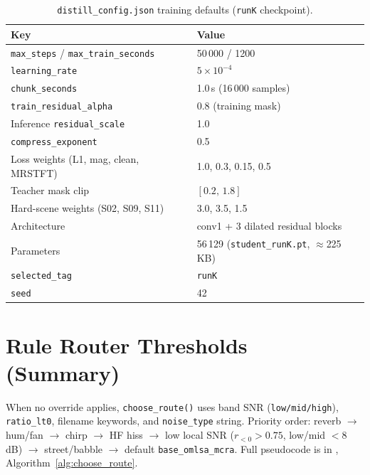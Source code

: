 \begin{table}[H]
  \centering
  \caption{\texttt{distill\_config.json} training defaults (\texttt{runK} checkpoint).}
  \label{tab:hp_distill}
  \footnotesize
  \begin{tabular}{ll}
    \toprule
    \textbf{Key} & \textbf{Value} \\
    \midrule
    \texttt{max\_steps} / \texttt{max\_train\_seconds} & 50\,000 / 1200 \\
    \texttt{learning\_rate} & $5\times 10^{-4}$ \\
    \texttt{chunk\_seconds} & 1.0\,s (16\,000 samples) \\
    \texttt{train\_residual\_alpha} & 0.8 (training mask) \\
    Inference \texttt{residual\_scale} & 1.0 \\
    \texttt{compress\_exponent} & 0.5 \\
    Loss weights (L1, mag, clean, MRSTFT) & 1.0, 0.3, 0.15, 0.5 \\
    Teacher mask clip & $[0.2,\, 1.8]$ \\
    Hard-scene weights (S02, S09, S11) & 3.0, 3.5, 1.5 \\
    Architecture & conv1 + 3 dilated residual blocks \\
    Parameters & 56\,129 (\texttt{student\_runK.pt}, $\approx$225\,KB) \\
    \texttt{selected\_tag} & \texttt{runK} \\
    \texttt{seed} & 42 \\
    \bottomrule
  \end{tabular}
\end{table}

\section{Rule Router Thresholds (Summary)}
\label{app:router_hp}

When no override applies, \texttt{choose\_route()} uses band SNR (\texttt{low/mid/high}), \texttt{ratio\_lt0}, filename keywords, and \texttt{noise\_type} string. Priority order: reverb $\to$ hum/fan $\to$ chirp $\to$ HF hiss $\to$ low local SNR ($r_{<0}>0.75$, low/mid ${<}8$\,dB) $\to$ street/babble $\to$ default \texttt{base\_omlsa\_mcra}. Full pseudocode is in , Algorithm~\ref{alg:choose_route}.
